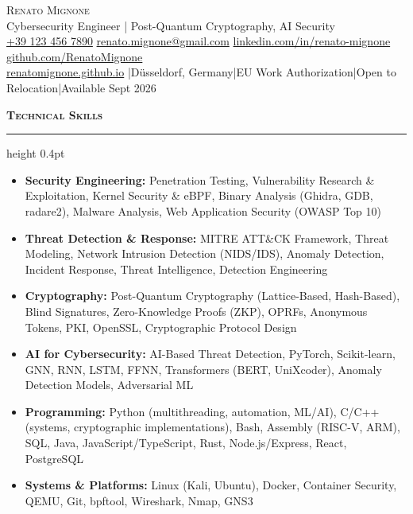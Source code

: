 \documentclass[a4paper,10pt]{article}
\newcommand{\mysection}[1]{%
  \vspace{0.3ex}
  {\large\bfseries\scshape\color{myblue} #1}\enspace%
  \leaders\hrule height 0.4pt\hfill\kern0pt
  \vspace{-0.2em}
}
\begin{document}
\begin{center}
    {\LARGE\scshape\color{myblue} Renato Mignone}\\[0.15em]
    {\normalsize Cybersecurity Engineer | Post-Quantum Cryptography, AI Security}\\[0.25em]
    \href{tel:+391234567890}{+39 123 456 7890} \quad
    \href{mailto:renato.mignone@gmail.com}{renato.mignone@gmail.com} \quad
    \href{https://www.linkedin.com/in/renato-mignone}{linkedin.com/in/renato-mignone} \quad
    \href{https://github.com/RenatoMignone}{github.com/RenatoMignone}\\
    \href{https://renatomignone.github.io}{renatomignone.github.io} \enspace|\enspace Düsseldorf, Germany\enspace|\enspace EU Work Authorization\enspace|\enspace Open to Relocation\enspace|\enspace Available Sept 2026
\end{center}

\mysection{Technical Skills}
\begin{itemize}
    \item \textbf{Security Engineering:} Penetration Testing, Vulnerability Research \& Exploitation, Kernel Security \& eBPF, Binary Analysis (Ghidra, GDB, radare2), Malware Analysis, Web Application Security (OWASP Top 10)
    \item \textbf{Threat Detection \& Response:} MITRE ATT\&CK Framework, Threat Modeling, Network Intrusion Detection (NIDS/IDS), Anomaly Detection, Incident Response, Threat Intelligence, Detection Engineering
    \item \textbf{Cryptography:} Post-Quantum Cryptography (Lattice-Based, Hash-Based), Blind Signatures, Zero-Knowledge Proofs (ZKP), OPRFs, Anonymous Tokens, PKI, OpenSSL, Cryptographic Protocol Design
    \item \textbf{AI for Cybersecurity:} AI-Based Threat Detection, PyTorch, Scikit-learn, GNN, RNN, LSTM, FFNN, Transformers (BERT, UniXcoder), Anomaly Detection Models, Adversarial ML
    \item \textbf{Programming:} Python (multithreading, automation, ML/AI), C/C++ (systems, cryptographic implementations), Bash, Assembly (RISC-V, ARM), SQL, Java, JavaScript/TypeScript, Rust, Node.js/Express, React, PostgreSQL
    \item \textbf{Systems \& Platforms:} Linux (Kali, Ubuntu), Docker, Container Security, QEMU, Git, bpftool, Wireshark, Nmap, GNS3
\end{itemize}
\end{document}
